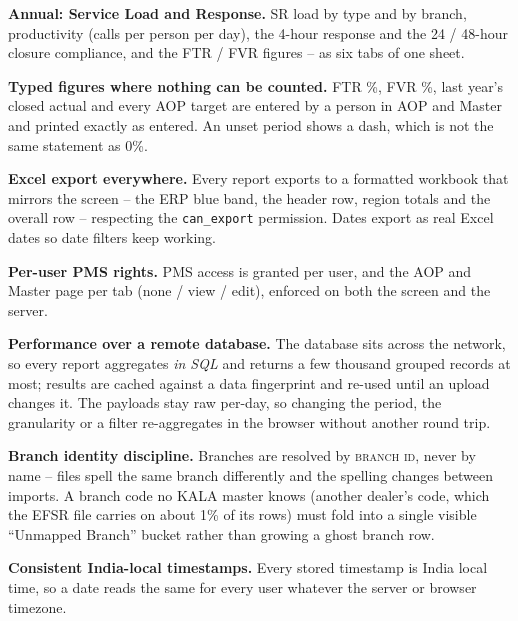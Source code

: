 \documentclass[11pt,a4paper]{article}
\newcommand{\qt}[1]{\textquotedblleft #1\textquotedblright}
\newcommand{\file}[1]{\texttt{\small #1}}
\newcommand{\col}[1]{\textsc{\small #1}}
\begin{document}
\begin{reqlist}
\item \textbf{Annual: Service Load and Response.} SR load by type and by branch,
productivity (calls per person per day), the 4-hour response and the 24 / 48-hour closure
compliance, and the FTR / FVR figures -- as six tabs of one sheet.

\item \textbf{Typed figures where nothing can be counted.} FTR \%, FVR \%, last year's
closed actual and every AOP target are entered by a person in AOP and Master and printed
exactly as entered. An unset period shows a dash, which is not the same statement as 0\%.

\item \textbf{Excel export everywhere.} Every report exports to a formatted workbook that
mirrors the screen -- the ERP blue band, the header row, region totals and the overall row
-- respecting the \file{can\_export} permission. Dates export as real Excel dates so date
filters keep working.

\item \textbf{Per-user PMS rights.} PMS access is granted per user, and the AOP and Master
page per tab (none / view / edit), enforced on both the screen and the server.

\item \textbf{Performance over a remote database.} The database sits across the network,
so every report aggregates \emph{in SQL} and returns a few thousand grouped records at
most; results are cached against a data fingerprint and re-used until an upload changes
it. The payloads stay raw per-day, so changing the period, the granularity or a filter
re-aggregates in the browser without another round trip.

\item \textbf{Branch identity discipline.} Branches are resolved by \col{branch id}, never
by name -- files spell the same branch differently and the spelling changes between
imports. A branch code no KALA master knows (another dealer's code, which the EFSR file
carries on about 1\% of its rows) must fold into a single visible \qt{Unmapped Branch}
bucket rather than growing a ghost branch row.

\item \textbf{Consistent India-local timestamps.} Every stored timestamp is India local
time, so a date reads the same for every user whatever the server or browser timezone.

\end{reqlist}
\end{document}
